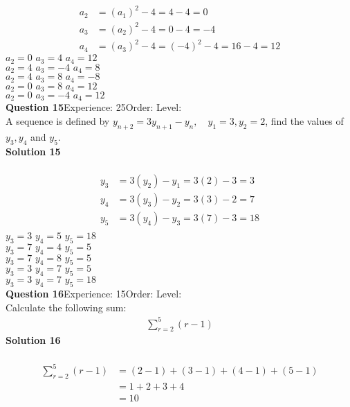 \documentclass{article}
\begin{document}
\\[-10pt]\begin{align*}
a_2&=(a_1)^2-4=4-4=0\\[2pt]
a_3&=(a_2)^2-4=0-4=-4\\[2pt]
a_4&=(a_3)^2-4=(-4)^2-4=16-4=12
\end{align*}
$a_2=0 \,\, a_3=4 \,\, a_4=12 $\\
$a_2=4 \,\, a_3=-4 \,\, a_4=8 $\\
$a_2=4 \,\, a_3=8 \,\, a_4=-8 $\\
$a_2=0 \,\, a_3=8 \,\, a_4=12 $\\
$a_2=0 \,\, a_3=-4 \,\, a_4=12 $\\
\noindent\textbf{Question 15}\hspace{20pt}Experience: 25\hspace{20pt}Order: \hspace{20pt}Level: \\[2pt]
A sequence is defined by $y_{n+2}=3y_{n+1}-y_n, \quad y_1=3,y_2=2$, find the values of $y_3,y_4$ and $y_5$.\\[4pt]
\noindent\textbf{Solution 15}\\[2pt]
\\[-10pt]\begin{align*}
y_3&=3(y_2)-y_1=3(2)-3=3\\[2pt]
y_4&=3(y_3)-y_2=3(3)-2=7\\[2pt]
y_5&=3(y_4)-y_3=3(7)-3=18\\[-30pt]
\end{align*}
$y_3=3 \,\, y_4=5 \,\, y_5=18 $\\
$y_3=7 \,\, y_4=4 \,\, y_5=5 $\\
$y_3=7 \,\, y_4=8 \,\, y_5=5 $\\
$y_3=3 \,\, y_4=7 \,\, y_5=5 $\\
$y_3=3 \,\, y_4=7 \,\, y_5=18 $\\
\noindent\textbf{Question 16}\hspace{20pt}Experience: 15\hspace{20pt}Order: \hspace{20pt}Level: \\[2pt]
Calculate the following sum:
\begin{align*}
\sum_{r=2}^{5} (r-1)
\end{align*}
\noindent\textbf{Solution 16}\\[2pt]
\\[-10pt]\begin{align*}
\sum_{r=2}^{5} (r-1)&=(2-1)+(3-1)+(4-1)+(5-1)\\[2pt]
&=1+2+3+4\\[2pt]
&=10
\end{align*}
\end{document}
